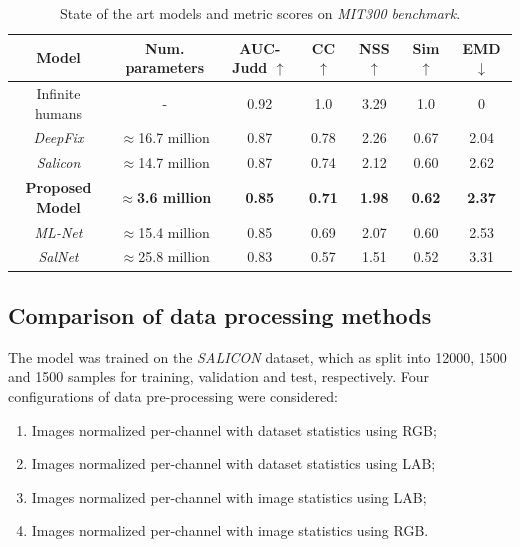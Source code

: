 \documentclass[10pt,twocolumn,letterpaper]{article}
\begin{document}
\begin{table}
	\small
    \begin{center}
    \label{table:results}
    \caption{State of the art models and metric scores on
    \emph{MIT300 benchmark}.}
    \begin{tabular}{|c|c|c|c|c|c|c|}
        \hline
        Model & Num. parameters & AUC-Judd $\uparrow$ & CC $\uparrow$
            & NSS $\uparrow$ & Sim $\uparrow$ & EMD $\downarrow$\\
        \hline
        Infinite humans & - & 0.92 & 1.0 & 3.29 & 1.0 & 0\\
        \hline
        \emph{DeepFix} & $\approx$16.7 million & 0.87 & 0.78
            & 2.26 & 0.67 & 2.04\\
        \hline
        \emph{Salicon} & $\approx$14.7 million & 0.87 & 0.74 & 2.12
            & 0.60 & 2.62\\
        \hline
        \textbf{Proposed Model} & $\approx$\textbf{3.6 million}
            & \textbf{0.85} &
        \textbf{0.71} & \textbf{1.98} & \textbf{0.62} & \textbf{2.37}\\
        \hline
        \emph{ML-Net} & $\approx$15.4 million & 0.85 & 0.69 & 2.07 & 0.60
            & 2.53\\
        \hline
        \emph{SalNet} & $\approx$25.8 million & 0.83 & 0.57 & 1.51
            & 0.52 & 3.31\\
        \hline
    \end{tabular}
    \end{center}
\end{table}

\subsection{Comparison of data processing methods}
\label{sec:dataproc_compar}
The model was trained on the \emph{SALICON} dataset, which as split into
12000, 1500 and 1500 samples for training, validation and test, respectively.
Four configurations of data pre-processing were considered:
\begin{enumerate}
    \item Images normalized per-channel with dataset statistics using RGB;
    \item Images normalized per-channel with dataset statistics using LAB;
    \item Images normalized per-channel with image statistics using LAB;
    \item Images normalized per-channel with image statistics using RGB.
\end{enumerate}
\end{document}
